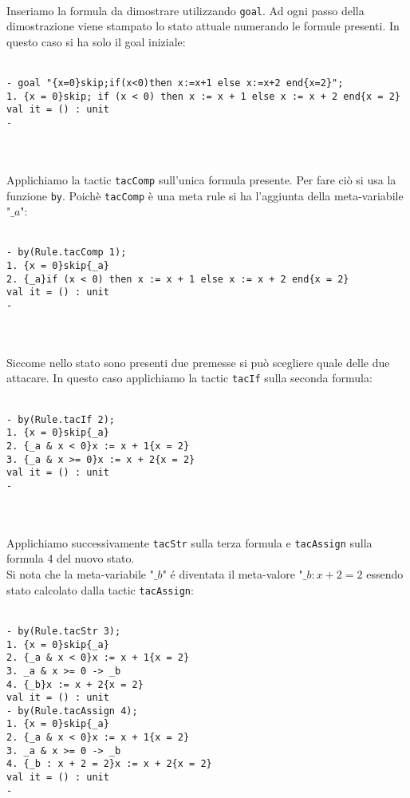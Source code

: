 \documentclass[]{article}
\begin{document}
\\
Inseriamo la formula da dimostrare utilizzando \texttt{goal}. Ad ogni passo della dimostrazione viene stampato lo stato attuale numerando le formule presenti. In questo caso si ha solo il goal iniziale:
\\
\\
\begin{BVerbatim}
- goal "{x=0}skip;if(x<0)then x:=x+1 else x:=x+2 end{x=2}";
1. {x = 0}skip; if (x < 0) then x := x + 1 else x := x + 2 end{x = 2}
val it = () : unit
-
\end{BVerbatim}
\\
\\
Applichiamo la tactic \texttt{tacComp} sull'unica formula presente. Per fare ci\`o si usa la funzione \texttt{by}. Poich\`e \texttt{tacComp} \`e una meta rule si ha l'aggiunta della meta-variabile  "$\_a$":
\\
\\
\begin{BVerbatim}
- by(Rule.tacComp 1);
1. {x = 0}skip{_a}
2. {_a}if (x < 0) then x := x + 1 else x := x + 2 end{x = 2}
val it = () : unit
-
\end{BVerbatim}
\\
\\
Siccome nello stato sono presenti due premesse si pu\`o scegliere quale delle due attacare. In questo caso applichiamo la tactic \texttt{tacIf} sulla seconda formula:
\\
\\
\begin{BVerbatim}
- by(Rule.tacIf 2);
1. {x = 0}skip{_a}
2. {_a & x < 0}x := x + 1{x = 2}
3. {_a & x >= 0}x := x + 2{x = 2}
val it = () : unit
-
\end{BVerbatim}
\\
\\
Applichiamo successivamente \texttt{tacStr} sulla terza formula e \texttt{tacAssign} sulla formula 4 del nuovo stato.
\pagebreak
\\
Si nota che la meta-variabile "$\_b$" \'e diventata il meta-valore "$\_b : x + 2 = 2$ essendo stato calcolato dalla tactic \texttt{tacAssign}:
\\
\\
\begin{BVerbatim}
- by(Rule.tacStr 3);
1. {x = 0}skip{_a}
2. {_a & x < 0}x := x + 1{x = 2}
3. _a & x >= 0 -> _b
4. {_b}x := x + 2{x = 2}
val it = () : unit
- by(Rule.tacAssign 4);
1. {x = 0}skip{_a}
2. {_a & x < 0}x := x + 1{x = 2}
3. _a & x >= 0 -> _b
4. {_b : x + 2 = 2}x := x + 2{x = 2}
val it = () : unit
-
\end{BVerbatim}
\end{document}
